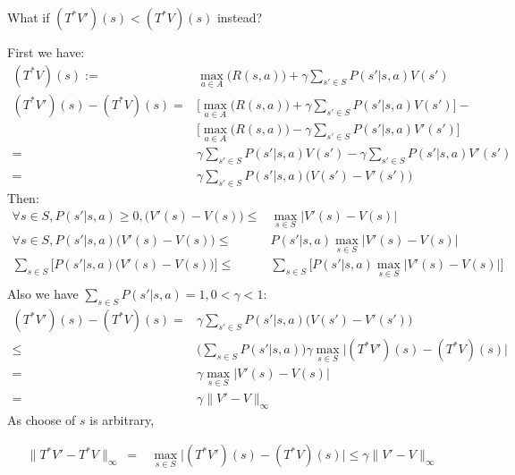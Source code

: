 \documentclass[11pt]{article}
\theoremstyle{case}
\newcommand{\norm}[2][2]{\| #2\|}
\begin{document}
What if $(T^*V')(s) < (T^*V)(s)$ instead?
\begin{shaded}
First we have:\\
\begin{align*}
    (T^*V)(s) := &\max_{a \in A} \big( R(s,a) \big)+ \gamma \sum_{s' \in S}P(s'|s,a)V(s') \\
(T^*V')(s)-(T^*V)(s) = & \big[ \max_{a \in A} \big( R(s,a) \big)+ \gamma \sum_{s' \in S}P(s'|s,a)V(s')  \big]- \\
										  & \big[ \max_{a \in A} \big( R(s,a) \big) - \gamma \sum_{s' \in S}P(s'|s,a)V'(s') \big] \\
									  = & \gamma \sum_{s' \in S}P(s'|s,a)V(s') - \gamma \sum_{s' \in S}P(s'|s,a)V'(s') \\
									  = & \gamma \sum_{s' \in S}P(s'|s,a) \big(V(s') - V'(s')\big)
\end{align*}
Then:
\begin{align*}
\forall s \in S,P(s'|s,a) \geq 0, \big(V'(s)-V(s)\big) \leq & \max_{s \in S}\big|V'(s)-V(s)\big|\\
\forall s \in S, P(s'|s,a) \big( V'(s)-V(s) \big) \leq & P(s'|s,a) \max_{s \in S}\big|V'(s)-V(s)\big| \\
\sum_{s \in S} \big[ P(s'|s,a) \big( V'(s)-V(s) \big) \big] \leq & \sum_{s \in S} \big[ P(s'|s,a) \max_{s \in S}\big|V'(s)-V(s) \big| \big]\\
\end{align*}
Also we have $\sum_{s \in S}P(s'|s,a)=1, 0<\gamma<1$: 
\begin{align*}
(T^*V')(s)-(T^*V)(s) = &\gamma \sum_{s' \in S}P(s'|s,a) \big(V(s') - V'(s')\big)\\
 \leq & \big( \sum_{s \in S}P(s'|s,a) \big) \gamma\max_{s \in S}\big|(T^*V')(s)-(T^*V)(s)\big| \\
  = & \gamma\max_{s \in S} \big| V'(s)-V(s) \big| \\
 =  & \gamma\norm{V'-V}_\infty
\end{align*}
As choose of $s$ is arbitrary, 

\begin{align*}\norm{T^*V'-T^*V}_\infty\ 
	= & \max_{s \in S}\big|(T^*V')(s)-(T^*V)(s)\big| \leq  \gamma\norm{V'-V}_\infty \\
\end{align*}

\end{shaded}

\newpage
\end{document}
